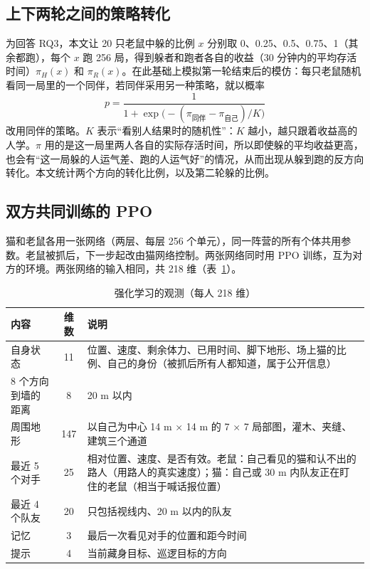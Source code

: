 \subsection{上下两轮之间的策略转化}
\label{sec:imitate}
为回答 RQ3，本文让 20 只老鼠中躲的比例 $x$ 分别取 0、0.25、0.5、0.75、1（其余都跑），每个 $x$ 跑 256 局，得到躲者和跑者各自的收益（30 分钟内的平均存活时间）$\pi_H(x)$ 和 $\pi_R(x)$。在此基础上模拟第一轮结束后的模仿：每只老鼠随机看同一局里的一个同伴，若同伴采用另一种策略，就以概率
\begin{equation}
p = \frac{1}{1+\exp\!\big(-(\pi_{\text{同伴}}-\pi_{\text{自己}})/K\big)}
\end{equation}
改用同伴的策略\cite{szabo1998,traulsen2006}。$K$ 表示“看别人结果时的随机性”：$K$ 越小，越只跟着收益高的人学。$\pi$ 用的是这一局里两人各自的实际存活时间，所以即使躲的平均收益更高，也会有“这一局躲的人运气差、跑的人运气好”的情况，从而出现从躲到跑的反方向转化。本文统计两个方向的转化比例，以及第二轮躲的比例。

\subsection{双方共同训练的 PPO}
\label{sec:obs}
猫和老鼠各用一张网络（两层、每层 256 个单元），同一阵营的所有个体共用参数。老鼠被抓后，下一步起改由猫网络控制。两张网络同时用 PPO 训练，互为对方的环境。两张网络的输入相同，共 218 维（表~\ref{tab:obs}）。

\begin{table}[htbp]
  \centering\small
  \caption{强化学习的观测（每人 218 维）}
  \label{tab:obs}
  \renewcommand{\arraystretch}{1.2}
  \begin{tabularx}{\textwidth}{@{}lcX@{}}
    \toprule
    内容 & 维数 & 说明\\
    \midrule
    自身状态 & 11 & 位置、速度、剩余体力、已用时间、脚下地形、场上猫的比例、自己的身份（被抓后所有人都知道，属于公开信息）\\
    8 个方向到墙的距离 & 8 & 20 m 以内\\
    周围地形 & 147 & 以自己为中心 14 m × 14 m 的 7 × 7 局部图，灌木、夹缝、建筑三个通道\\
    最近 5 个对手 & 25 & 相对位置、速度、是否有效。老鼠：自己看见的猫和认不出的路人（用路人的真实速度）；猫：自己或 30 m 内队友正在盯住的老鼠（相当于喊话报位置）\\
    最近 4 个队友 & 20 & 只包括视线内、20 m 以内的队友\\
    记忆 & 3 & 最后一次看见对手的位置和距今时间\\
    提示 & 4 & 当前藏身目标、巡逻目标的方向\\
    \bottomrule
  \end{tabularx}
\end{table}

